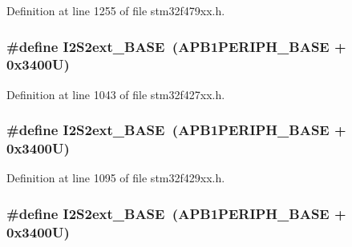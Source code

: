 Definition at line 1255 of file stm32f479xx.\+h.

\subsubsection[{\texorpdfstring{I2\+S2ext\+\_\+\+B\+A\+SE}{I2S2ext_BASE}}]{\setlength{\rightskip}{0pt plus 5cm}\#define I2\+S2ext\+\_\+\+B\+A\+SE~({\bf A\+P\+B1\+P\+E\+R\+I\+P\+H\+\_\+\+B\+A\+SE} + 0x3400\+U)}\hypertarget{group___peripheral__memory__map_gaa5f7b241ed5b756decd835300c9e7bc9}{}\label{group___peripheral__memory__map_gaa5f7b241ed5b756decd835300c9e7bc9}


Definition at line 1043 of file stm32f427xx.\+h.

\subsubsection[{\texorpdfstring{I2\+S2ext\+\_\+\+B\+A\+SE}{I2S2ext_BASE}}]{\setlength{\rightskip}{0pt plus 5cm}\#define I2\+S2ext\+\_\+\+B\+A\+SE~({\bf A\+P\+B1\+P\+E\+R\+I\+P\+H\+\_\+\+B\+A\+SE} + 0x3400\+U)}\hypertarget{group___peripheral__memory__map_gaa5f7b241ed5b756decd835300c9e7bc9}{}\label{group___peripheral__memory__map_gaa5f7b241ed5b756decd835300c9e7bc9}


Definition at line 1095 of file stm32f429xx.\+h.

\subsubsection[{\texorpdfstring{I2\+S2ext\+\_\+\+B\+A\+SE}{I2S2ext_BASE}}]{\setlength{\rightskip}{0pt plus 5cm}\#define I2\+S2ext\+\_\+\+B\+A\+SE~({\bf A\+P\+B1\+P\+E\+R\+I\+P\+H\+\_\+\+B\+A\+SE} + 0x3400\+U)}\hypertarget{group___peripheral__memory__map_gaa5f7b241ed5b756decd835300c9e7bc9}{}\label{group___peripheral__memory__map_gaa5f7b241ed5b756decd835300c9e7bc9}


